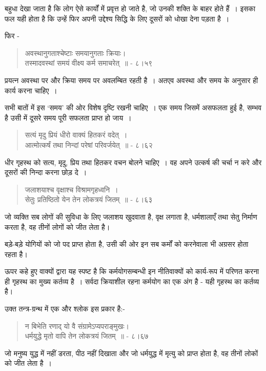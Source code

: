 बहुधा देखा जाता है कि लोग ऐसे कार्यों में प्रवृत्त हो जाते है, जो उनकी शक्ति के बाहर होते हैं~। इसका फल यही होता है कि उन्हें फिर अपनी उद्देश्य सिद्धि के लिए दूसरों को धोखा देना पड़ता है~।

फिर -

\begin{verse}
अवस्थानुगताश्चेष्टाः समयानुगताः क्रियाः।\\ तस्मादवस्थां समयं वीक्ष्य कर्म समाचरेत्~॥ - ८।५९
\end{verse}

प्रयत्न अवस्था पर और क्रिया समय पर अवलम्बित रहती है~। अतएव अवस्था और समय के अनुसार ही कार्य करना चाहिए~।

सभी बातों में इस ‘समय’ की ओर विशेष दृष्टि रखनी चाहिए~। एक समय जिसमें असफलता हुई है, सम्भव है उसी में दूसरे समय पूरी सफलता प्राप्त हो जाय~।

\begin{verse}
सत्यं मृदु प्रियं धीरो वाक्यं हितकरं वदेत्~।\\ आत्मोत्कर्षं तथा निन्दां परेषां परिवर्जयेत्~॥ - ८।६२
\end{verse}

धीर गृहस्थ को सत्य, मृदु, प्रिय तथा हितकर वचन बोलने चाहिए~। वह अपने उत्कर्ष की चर्चा न करे और दूसरों की निन्दा करना छोड़ दे~।

\begin{verse}
जलाशयाश्च वृक्षाश्च विश्रामगृहध्वनि~।\\ सेतुः प्रतिष्ठितो येन तेन लोकत्रयं जितम्~॥ - ८।६३
\end{verse}

जो व्यक्ति सब लोगों की सुविधा के लिए जलाशय खुदवाता है, वृक्ष लगाता है, धर्मशालाएँ तथा सेतु निर्माण करता है, वह तीनों लोगों को जीत लेता है।

बड़े-बड़े योगियों को जो पद प्राप्त होता है, उसी की ओर इन सब कर्मों को करनेवाला भी अग्रसर होता रहता है।

ऊपर कहे हुए वाक्यों द्वारा यह स्पष्ट है कि कर्मयोगसम्बन्धी इन नीतिवाक्यों को कार्य-रूप में परिणत करना ही गृहस्थ का मुख्य कर्तव्य है~। सर्वदा क्रियाशील रहना कर्मयोग का एक अंग है - यही गृहस्थ का कर्तव्य है।

उक्त तन्त्र-ग्रन्थ में एक और श्लोक इस प्रकार है:-

\begin{verse}
न बिभेति रणाद् यो वै संग्रामेऽप्यपराङ्मुखः।\\ धर्मयुद्धे मृतो वापि तेन लोकत्रयं जितम्~॥ - ८।६७
\end{verse}

जो मनुष्य युद्ध में नहीं डरता, पीठ नहीं दिखाता और जो धर्मयुद्ध में मृत्यु को प्राप्त होता है, वह तीनों लोकों को जीत लेता है~।

